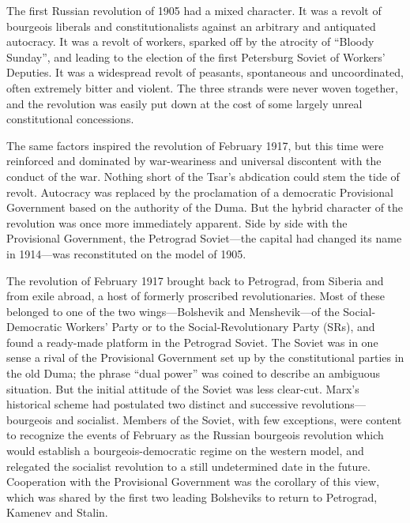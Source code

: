 The first Russian revolution of 1905 had a mixed character. It was a revolt of bourgeois liberals and constitutionalists against an arbitrary and antiquated autocracy. It was a revolt of workers, sparked off by the atrocity of ``Bloody Sunday'', and leading to the election of the first Petersburg Soviet of Workers' Deputies. It was a widespread revolt of peasants, spontaneous and uncoordinated, often extremely bitter and violent. The three strands were never woven together, and the revolution was easily put down at the cost of some largely unreal constitutional concessions. 

The same factors inspired the revolution of February 1917, but this time were reinforced and dominated by war-weariness and universal discontent with the conduct of the war. Nothing short of the Tsar's abdication could stem the tide of revolt. Autocracy was replaced by the proclamation of a democratic Provisional Government based on the authority of the Duma. But the hybrid character of the revolution was once more immediately apparent. Side by side with the Provisional Government, the Petrograd Soviet---the capital had changed its name in 1914---was reconstituted on the model of 1905. 

The revolution of February 1917 brought back to Petrograd, from Siberia and from exile abroad, a host of formerly proscribed revolutionaries. Most of these belonged to one of the two wings---Bolshevik and Menshevik---of the Social-Democratic Workers' Party or to the Social-Revolutionary Party (SRs), and found a ready-made platform in the Petrograd Soviet. The Soviet was in one sense a rival of the Provisional Government set up by the constitutional parties in the old Duma; the phrase ``dual power'' was coined to describe an ambiguous situation. But the initial attitude of the Soviet was less clear-cut. Marx's historical scheme had postulated two distinct and successive revolutions---bourgeois and socialist. Members of the Soviet, with few exceptions, were content to recognize the events of February as the Russian bourgeois revolution which would establish a bourgeois-democratic regime on the western model, and relegated the socialist revolution to a still undetermined date in the future. Cooperation with the Provisional Government was the corollary of this view, which was shared by the first two leading Bolsheviks to return to Petrograd, Kamenev and Stalin. 

